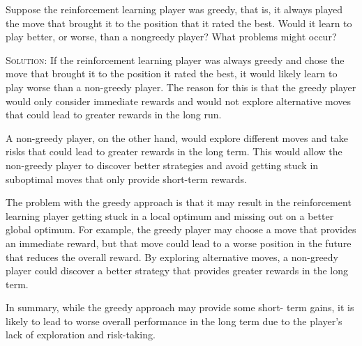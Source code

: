 \documentclass{article}
\begin{document}
Suppose the reinforcement learning player was greedy, 
that is, it always played the move that brought it to the position 
that it rated the best. Would it learn to play better, or worse, 
than a nongreedy player? What problems might occur?

\textsc{Solution:} If the reinforcement learning player was 
always greedy and chose the move that brought it to the position it
rated the best, it would likely learn to play worse than a 
non-greedy player. The reason for this is that the greedy player 
would only consider immediate rewards and would not explore 
alternative moves that could lead to greater rewards in the long run.

A non-greedy player, on the other hand, would explore different 
moves and take risks that could lead to greater rewards in the 
long term. This would allow the non-greedy player to discover 
better strategies and avoid getting stuck in suboptimal moves 
that only provide short-term rewards.

The problem with the greedy approach is that it may result in 
the reinforcement learning player getting stuck in a local optimum 
and missing out on a better global optimum. For example, the greedy 
player may choose a move that provides an immediate reward, but 
that move could lead to a worse position in the future that 
reduces the overall reward. By exploring alternative moves, a 
non-greedy player could discover a better strategy that provides 
greater rewards in the long term.

In summary, while the greedy approach may provide some short-
term gains, it is likely to lead to worse overall performance in 
the long term due to the player's lack of exploration and 
risk-taking.
\end{document}

